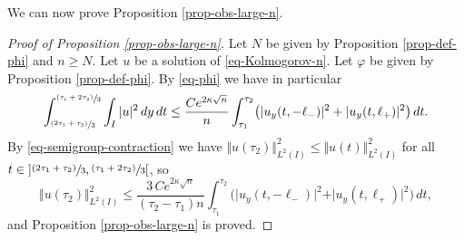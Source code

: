 \documentclass[JEP,XML,SOM,Unicode]{cedram}
\newcommand{\psfrac}[2]{\sfrac{(#1)}{#2}}
\theoremstyle{plain}
\theoremstyle{definition}
\newcommand{\abs}[1]{\vert #1\vert}
\newcommand{\nr}[1]{\Vert #1\Vert}
\newcommand{\1}{\mathds 1}
\let\k\kappa
\let\f\varphi
\begin{document}
We can now prove Proposition \ref{prop-obs-large-n}.

\begin{proof}[Proof of Proposition \ref{prop-obs-large-n}]
Let $N$ be given by Proposition \ref{prop-def-phi} and $n \geq N$. Let $u$ be a solution of \eqref{eq-Kolmogorov-n}. Let $\f$ be given by Proposition \ref{prop-def-phi}. By \eqref{eq-phi} we have in particular
\[
\int_{\psfrac{2 \tau_1 + \tau_2}{3}}^{\psfrac{\tau_1 + 2\tau_2}{3}} \int_{I} \abs{u}^2 \, dy \, dt \leq \frac {C e^{2 \k \sqrt n}} n \int_{\tau_1}^{\tau_2} \bigl(\abs{u_y (t,-\ell_-)}^2 + \abs{u_y(t,\ell_+)}^2 \bigr) \, dt.
\]
By \eqref{eq-semigroup-contraction} we have $\nr{u(\tau_2)}_{L^2(I)}^2 \leq \nr{u(t)}_{L^2(I)}^2$ for all $t \in{}] \psfrac{2\tau_1 + \tau_2}{3}, \psfrac{\tau_1 + 2\tau_2}{3}[$, so
\[
\nr{u(\tau_2)}_{L^2(I)}^2 \leq \frac{3\,C e^{2 \k \sqrt n}}{(\tau_2-\tau_1)n} \int_{\tau_1}^{\tau_2} \bigl(\abs{u_y (t,-\ell_-)}^2 + \abs{u_y(t,\ell_+)}^2 \bigr) \, dt,
\]
and Proposition \ref{prop-obs-large-n} is proved.
\end{proof}




\end{document}

